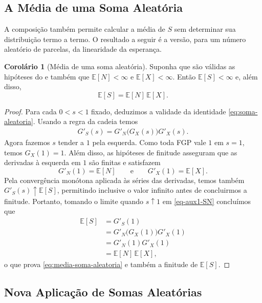 \documentclass[12pt,portuguese]{article}
\theoremstyle{definition}
\newtheorem{corollary}[corollary]{Corolário}
\theoremstyle{plainexercise}
\theoremstyle{starredexercise}
\theoremstyle{definition}
\begin{document}
\subsection{A Média de uma Soma Aleatória}
\label{sec:media-soma-aleatoria}

A composição também permite calcular a média de $S$ sem determinar sua
distribuição termo a termo. O resultado a seguir é a versão, para um número
aleatório de parcelas, da linearidade da esperança.

\begin{corollary}[Média de uma soma aleatória]
\label{cor:media-soma-aleatoria}
Suponha que são válidas as hipóteses do  e também que
$\mathbb{E}[N]<\infty$ e $\mathbb{E}[X]<\infty$. Então
$\mathbb{E}[S]<\infty$ e, além disso,
\begin{equation}
\label{eq:media-soma-aleatoria}
\mathbb{E}[S]=\mathbb{E}[N] \, \mathbb{E}[X].
\end{equation}
\end{corollary}

\begin{proof}
Para cada $0<s<1$ fixado, deduzimos a validade da identidade \eqref{eq:soma-aleatoria}. 
Usando a regra da cadeia temos
\begin{align}\label{eq-aux1-SN}
G'_S(s)=G'_N\bigl(G_X(s)\bigr)G'_X(s).
\end{align}
Agora fazemos $s$ tender a $1$ pela esquerda. Como toda FGP vale $1$ em
$s=1$, temos $G_X(1)=1$. Além disso, as hipóteses de finitude asseguram que
as derivadas à esquerda em $1$ são finitas e satisfazem
\[
G'_N(1)=\mathbb{E}[N]
\qquad\text{e}\qquad
G'_X(1)=\mathbb{E}[X].
\]
Pela convergência monótona aplicada às séries das derivadas, temos também
$G'_S(s)\uparrow\mathbb{E}[S]$, permitindo inclusive o valor infinito antes
de concluirmos a finitude. Portanto, tomando o limite quando $s\uparrow 1$ 
em \eqref{eq-aux1-SN} concluímos que
\begin{align*}
\mathbb{E}[S]
&=G'_S(1)
\\[0.2cm]
&=G'_N\bigl(G_X(1)\bigr)G'_X(1)
\\[0.2cm]
&=G'_N(1)G'_X(1)
\\[0.2cm]
&=\mathbb{E}[N] \, \mathbb{E}[X],
\end{align*}
o que prova \eqref{eq:media-soma-aleatoria} e também a finitude de
$\mathbb{E}[S]$.
\end{proof}

\subsection{Nova Aplicação de Somas Aleatórias}
\label{sec:coelhas}
\end{document}
